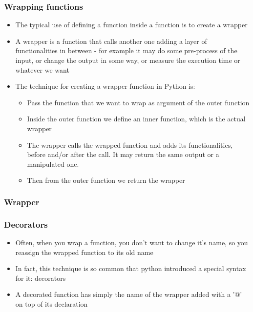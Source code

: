 \documentclass[9pt]{beamer}
\begin{document}
\begin{frame}
  \frametitle{Wrapping functions}
  \begin{itemize}
    \item The typical use of defining a function inside a function is to create
          a \alert{wrapper}
    \item A wrapper is a function that calls another one adding a layer
          of functionalities in between - for example it may do some pre-process
          of the input, or change the output in some way, or measure the 
          execution time or whatever we want
    \item The technique for creating a wrapper function in Python is:
    \begin{itemize}
       \item Pass the function that we want to wrap as argument of the outer
             function
       \item Inside the outer function we define an inner function, which is the
             actual wrapper
       \item The wrapper calls the wrapped function and adds its functionalities,
             before and/or after the call. It may return the same output or a 
             manipulated one.
       \item Then from the outer function we return the wrapper
    \end{itemize}
  \end{itemize}
  
\end{frame}


\begin{frame}
  \frametitle{Wrapper}
  
\end{frame}


\begin{frame}
  \frametitle{Decorators}
  \begin{itemize}
    \item Often, when you wrap a function, you don't want to change
          it's name, so you reassign the wrapped function to its old name
    \item In fact, this technique is so common that python introduced a special
          syntax for it: decorators
    \item A decorated function has simply the name of the wrapper added with
          a '@' on top of its declaration
  \end{itemize}
  
\end{frame}
\end{document}
